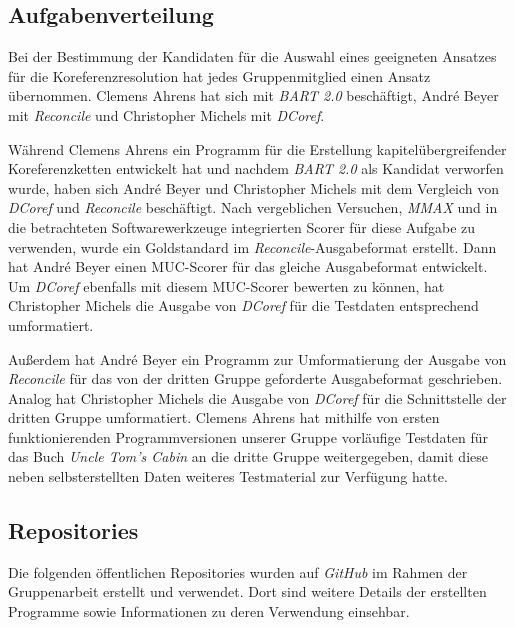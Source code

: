 \documentclass[a4paper,12pt,titlepage=true, ngerman]{scrartcl}
\begin{document}
\subsection{Aufgabenverteilung}%

Bei der Bestimmung der Kandidaten für die Auswahl eines geeigneten Ansatzes für die Koreferenzresolution 
hat jedes Gruppenmitglied einen Ansatz übernommen. 
Clemens Ahrens hat sich mit \emph{BART 2.0} beschäftigt, André Beyer mit \emph{Reconcile} und 
Christopher Michels mit \emph{DCoref}.

Während Clemens Ahrens ein Programm für die Erstellung kapitelübergreifender Koreferenzketten entwickelt hat 
und nachdem \emph{BART 2.0} als Kandidat verworfen wurde, 
haben sich André Beyer und Christopher Michels mit dem Vergleich von \emph{DCoref} 
und \emph{Reconcile} beschäftigt. 
Nach vergeblichen Versuchen, \emph{MMAX} und in die betrachteten Softwarewerkzeuge integrierten Scorer 
für diese Aufgabe zu verwenden, wurde ein Goldstandard im \emph{Reconcile}-Ausgabeformat erstellt. 
Dann hat André Beyer einen MUC-Scorer für das gleiche Ausgabeformat entwickelt. 
Um \emph{DCoref} ebenfalls mit diesem MUC-Scorer bewerten zu können, 
hat Christopher Michels die Ausgabe von \emph{DCoref} für die Testdaten entsprechend umformatiert.

Außerdem hat André Beyer ein Programm zur Umformatierung der Ausgabe von \emph{Reconcile} für das 
von der dritten Gruppe geforderte Ausgabeformat geschrieben. 
Analog hat Christopher Michels die Ausgabe von \emph{DCoref} für die Schnittstelle der dritten Gruppe umformatiert. 
Clemens Ahrens hat mithilfe von ersten funktionierenden Programmversionen unserer Gruppe vorläufige Testdaten 
für das Buch \emph{Uncle Tom's Cabin} \autocite[]{chris_uncle} an die dritte Gruppe weitergegeben, 
damit diese neben selbsterstellten Daten weiteres Testmaterial zur Verfügung hatte.


\subsection{Repositories}\label{Repositories}

Die folgenden öffentlichen Repositories wurden auf \emph{GitHub} \autocite[]{chris_github} im Rahmen 
der Gruppenarbeit erstellt und verwendet. 
Dort sind weitere Details der erstellten Programme sowie Informationen zu deren Verwendung einsehbar.
\end{document}
